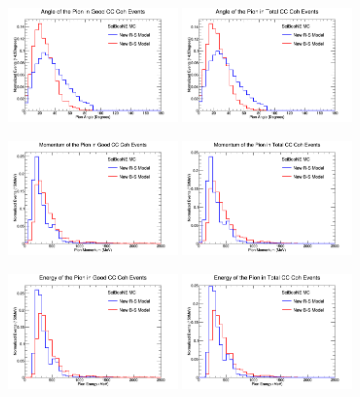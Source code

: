 \documentclass[11pt]{article}
\begin{document}
\begin{figure}[H]
\centering
\includegraphics[width=0.4\textwidth]{ANMPionPlottingImages/7-ANMPionPlotting.png}
\includegraphics[width=0.4\textwidth]{ANMPionPlottingImages/10-ANMPionPlotting.png}
\caption{}
\end{figure}

\begin{figure}[H]
\centering
\includegraphics[width=0.4\textwidth]{ANMPionPlottingImages/8-ANMPionPlotting.png}
\includegraphics[width=0.4\textwidth]{ANMPionPlottingImages/11-ANMPionPlotting.png}
\caption{}
\end{figure}

\begin{figure}[H]
\centering
\includegraphics[width=0.4\textwidth]{ANMPionPlottingImages/9-ANMPionPlotting.png}
\includegraphics[width=0.4\textwidth]{ANMPionPlottingImages/12-ANMPionPlotting.png}
\caption{}
\end{figure}
\end{document}

